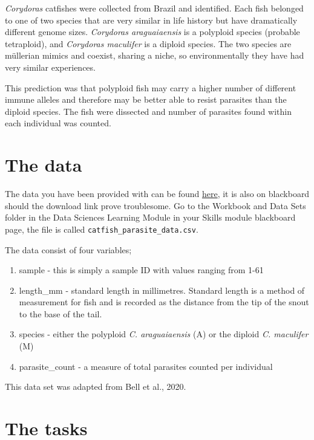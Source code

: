 \documentclass[
]{book}
\providecommand{\tightlist}{%
  \setlength{\itemsep}{0pt}\setlength{\parskip}{0pt}}
\begin{document}
\emph{Corydoras} catfishes were collected from Brazil and identified. Each fish belonged to one of two species that are very similar in life history but have dramatically different genome sizes. \emph{Corydoras araguaiaensis} is a polyploid species (probable tetraploid), and \emph{Corydoras maculifer} is a diploid species. The two species are müllerian mimics and coexist, sharing a niche, so environmentally they have had very similar experiences.

This prediction was that polyploid fish may carry a higher number of different immune alleles and therefore may be better able to resist parasites than the diploid species. The fish were dissected and number of parasites found within each individual was counted.

\hypertarget{the-data-1}{%
\section{The data}\label{the-data-1}}

The data you have been provided with can be found \href{https://downgit.github.io/\#/home?url=https://github.com/ellenbell/4008Y/blob/main/data/catfish_parasite_data.csv}{here}, it is also on blackboard should the download link prove troublesome. Go to the Workbook and Data Sets folder in the Data Sciences Learning Module in your Skills module blackboard page, the file is called \texttt{catfish\_parasite\_data.csv}.

The data consist of four variables;

\begin{enumerate}
\def\labelenumi{\arabic{enumi})}
\tightlist
\item
  sample - this is simply a sample ID with values ranging from 1-61
\item
  length\_mm - standard length in millimetres. Standard length is a method of measurement for fish and is recorded as the distance from the tip of the snout to the base of the tail.
\item
  species - either the polyploid \emph{C. araguaiaensis} (A) or the diploid \emph{C. maculifer} (M)
\item
  parasite\_count - a measure of total parasites counted per individual
\end{enumerate}

This data set was adapted from Bell et al., 2020.

\hypertarget{the-tasks}{%
\section{The tasks}\label{the-tasks}}
\end{document}
